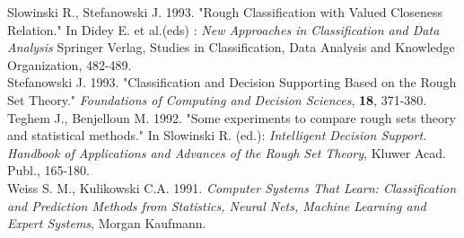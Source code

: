 {Slowinski R., Stefanowski J. 1993. "Rough Classification  with
Valued Closeness Relation." In Didey E. et al.(eds) : {\it New
Approaches in Classification and Data Analysis}
Springer Verlag, Studies in Classification, Data Analysis and
Knowledge Organization, 482-489.\\
Stefanowski J. 1993. "Classification and Decision Supporting
Based on the Rough  Set  Theory."  {\it  Foundations  of  Computing  and
Decision Sciences}, {\bf 18}, 371-380.\\
Teghem J., Benjelloun M. 1992.  "Some  experiments  to  compare
rough sets theory and statistical methods." In  Slowinski   R.   (ed.):
{\it Intelligent  Decision   Support. Handbook of Applications and Advances
of the Rough Set Theory}, Kluwer Acad.  Publ.,  165-180.\\
Weiss S. M., Kulikowski C.A. 1991. {\it Computer Systems  That
Learn: Classification and Prediction Methods from  Statistics,  Neural
Nets, Machine Learning and Expert Systems}, Morgan Kaufmann.
}


